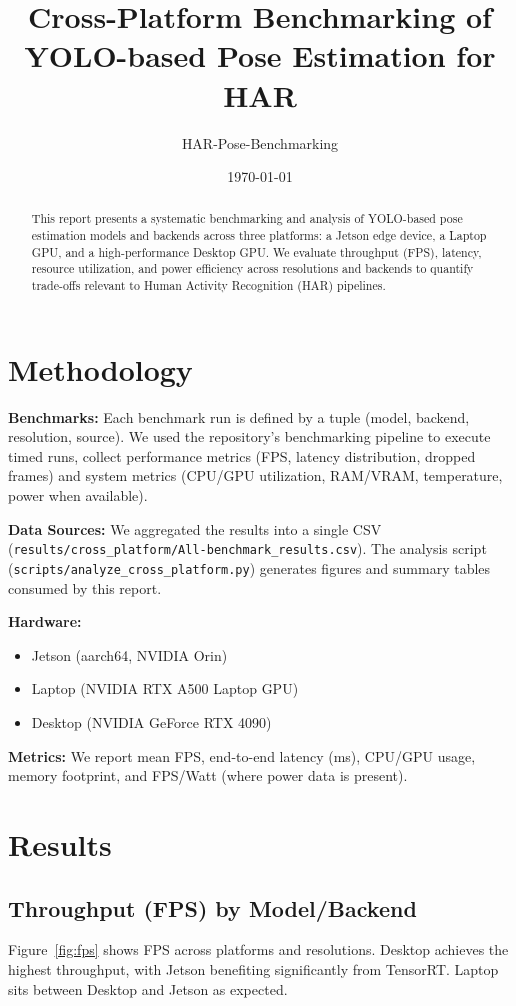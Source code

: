 \documentclass[11pt,a4paper]{article}
\title{Cross-Platform Benchmarking of YOLO-based Pose Estimation for HAR}
\author{HAR-Pose-Benchmarking}
\date{\today}
\begin{document}
\maketitle

\begin{abstract}
This report presents a systematic benchmarking and analysis of YOLO-based pose estimation models and backends across three platforms: a Jetson edge device, a Laptop GPU, and a high-performance Desktop GPU. We evaluate throughput (FPS), latency, resource utilization, and power efficiency across resolutions and backends to quantify trade-offs relevant to Human Activity Recognition (HAR) pipelines.
\end{abstract}

\section{Methodology}
\textbf{Benchmarks:} Each benchmark run is defined by a tuple (model, backend, resolution, source). We used the repository's benchmarking pipeline to execute timed runs, collect performance metrics (FPS, latency distribution, dropped frames) and system metrics (CPU/GPU utilization, RAM/VRAM, temperature, power when available).

\textbf{Data Sources:} We aggregated the results into a single CSV (\texttt{results/cross\_platform/All-benchmark\_results.csv}). The analysis script (\texttt{scripts/analyze\_cross\_platform.py}) generates figures and summary tables consumed by this report.

\textbf{Hardware:}
\begin{itemize}
  \item Jetson (aarch64, NVIDIA Orin)
  \item Laptop (NVIDIA RTX A500 Laptop GPU)
  \item Desktop (NVIDIA GeForce RTX 4090)
\end{itemize}

\textbf{Metrics:} We report mean FPS, end-to-end latency (ms), CPU/GPU usage, memory footprint, and FPS/Watt (where power data is present).

\section{Results}

\subsection{Throughput (FPS) by Model/Backend}
Figure~\ref{fig:fps} shows FPS across platforms and resolutions. Desktop achieves the highest throughput, with Jetson benefiting significantly from TensorRT. Laptop sits between Desktop and Jetson as expected.
\end{document}
